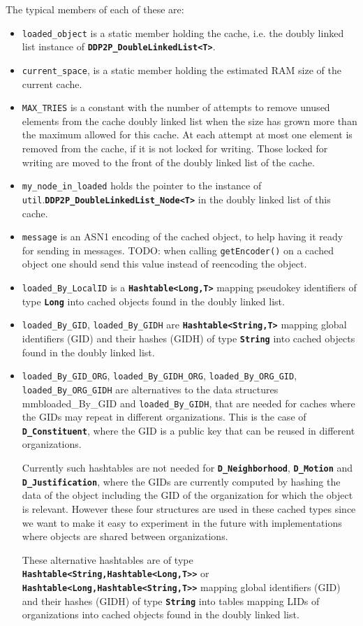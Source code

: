 \documentclass{book}
\newcommand{\pkg}[1]{{\tt #1}}
\newcommand{\cls}[1]{{\tt\bf #1}}
\newcommand{\mth}[1]{{\tt #1}}
\newcommand{\mmb}[1]{{\tt #1}}
\begin{document}
The typical members of each of these are:
\begin{itemize}
\item
\mmb{loaded\_object}
is a static member holding the cache, i.e. the doubly linked list instance of \cls{DDP2P\_DoubleLinkedList<T>}.
\item
\mmb{current\_space}, is a static member holding the estimated RAM size of the current cache.
\item
\mmb{MAX\_TRIES} is a constant with the number of attempts to remove unused elements from the cache doubly linked list
when the size has grown more than the maximum allowed for this cache. At each attempt at most one element is removed from the
cache, if it is not locked for writing. Those locked for writing are moved to the front of the doubly linked list of the cache.
\item
\mmb{my\_node\_in\_loaded}
holds the pointer to the instance of \pkg{util}.\cls{DDP2P\_DoubleLinkedList\_Node<T>} in the doubly linked list of this cache.
\item
\mmb{message} is an ASN1 encoding of the cached object, to help having it ready for sending in messages.
TODO: when calling \mth{getEncoder()} on a cached object one should send this value instead of reencoding the object.
 \item
\mmb{loaded\_By\_LocalID}
is a \cls{Hashtable<Long,T>} mapping pseudokey identifiers of type \cls{Long} into cached objects found in the doubly linked list.
\item
\mmb{loaded\_By\_GID},
\mmb{loaded\_By\_GIDH}
are  \cls{Hashtable<String,T>} mapping global identifiers (GID) and their hashes (GIDH) of type \cls{String} into cached objects found in the doubly linked list.
\item
\mmb{loaded\_By\_GID\_ORG},
\mmb{loaded\_By\_GIDH\_ORG},
\mmb{loaded\_By\_ORG\_GID},
\mmb{loaded\_By\_ORG\_GIDH} are alternatives to the data structures mmb{loaded\_By\_GID} and
\mmb{loaded\_By\_GIDH}, that are needed for caches where the GIDs may repeat in different organizations.
This is the case of \cls{D\_Constituent}, where the GID is a public key that can be reused in different organizations.

Currently such hashtables are not needed for \cls{D\_Neighborhood}, \cls{D\_Motion} and \cls{D\_Justification}, where the
GIDs are currently computed by hashing the data of the object including the GID of the organization for which the object is relevant.
However these four structures are used in these cached types since we want to make it easy to experiment in the future
with implementations where objects are shared between organizations.

These alternative hashtables are of type \cls{Hashtable<String,Hashtable<Long,T>>} or \cls{Hashtable<Long,Hashtable<String,T>>} mapping global identifiers (GID) and their hashes (GIDH) of type \cls{String} into tables mapping LIDs of organizations into cached objects found in the doubly linked list.
\end{itemize}
\end{document}
